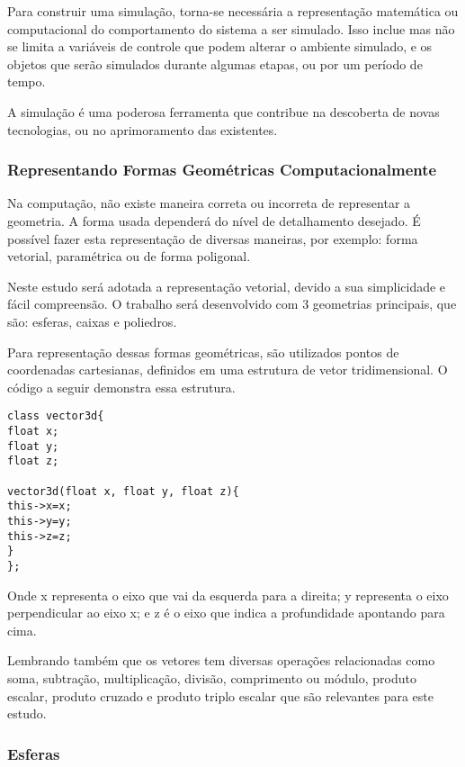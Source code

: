 Para construir uma simulação, torna-se necessária a representação matemática ou
computacional do comportamento do sistema a ser simulado. Isso inclue mas não
se limita a variáveis de controle que podem alterar o ambiente simulado, e os
objetos que serão simulados durante algumas etapas, ou por um período de tempo.

A simulação é uma poderosa ferramenta que contribue na descoberta de novas
tecnologias, ou no aprimoramento das existentes.


\subsubsection{Representando Formas Geométricas Computacionalmente}
Na computação, não existe maneira correta ou incorreta de representar a
geometria. A forma usada dependerá  do nível de detalhamento desejado. É possível fazer esta representação de diversas maneiras, por exemplo: forma vetorial, paramétrica ou de forma poligonal.

Neste estudo será adotada a representação vetorial, devido a sua simplicidade e fácil compreensão. O trabalho será desenvolvido com 3 geometrias principais, que são: esferas, caixas e poliedros.

Para representação dessas formas geométricas, são utilizados pontos de coordenadas cartesianas, definidos em uma estrutura de vetor tridimensional. O código a seguir demonstra essa estrutura.

\begin{lstlisting}[frame=single,caption=Exemplo de vetor 3d\label{code:vec3d_1}]
class vector3d{
float x;
float y;
float z;

vector3d(float x, float y, float z){
this->x=x;
this->y=y;
this->z=z;
}
};
\end{lstlisting}

Onde x representa o eixo que vai da esquerda para a direita;
y representa o eixo  perpendicular ao eixo x;
e z é o eixo que indica a profundidade apontando para cima.


Lembrando também que os vetores tem diversas operações relacionadas como soma,
subtração, multiplicação, divisão, comprimento ou módulo, produto escalar,
produto cruzado e produto triplo escalar que são relevantes para este estudo.

\subsubsection{Esferas}

